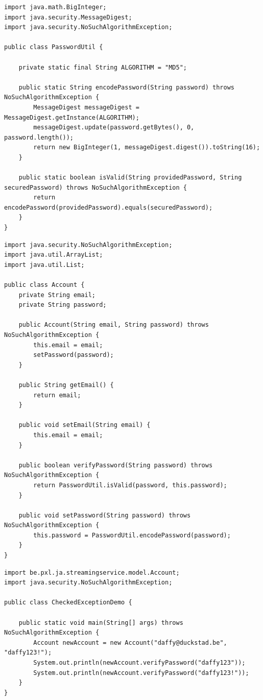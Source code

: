 \begin{lstlisting}
import java.math.BigInteger;
import java.security.MessageDigest;
import java.security.NoSuchAlgorithmException;

public class PasswordUtil {

	private static final String ALGORITHM = "MD5";

	public static String encodePassword(String password) throws NoSuchAlgorithmException {
		MessageDigest messageDigest = MessageDigest.getInstance(ALGORITHM);
		messageDigest.update(password.getBytes(), 0, password.length());
		return new BigInteger(1, messageDigest.digest()).toString(16);
	}

	public static boolean isValid(String providedPassword, String securedPassword) throws NoSuchAlgorithmException {
		return encodePassword(providedPassword).equals(securedPassword);
	}
}
\end{lstlisting}

\begin{lstlisting}
import java.security.NoSuchAlgorithmException;
import java.util.ArrayList;
import java.util.List;

public class Account {
	private String email;
	private String password;

	public Account(String email, String password) throws NoSuchAlgorithmException {
		this.email = email;
		setPassword(password);
	}

	public String getEmail() {
		return email;
	}

	public void setEmail(String email) {
		this.email = email;
	}

	public boolean verifyPassword(String password) throws NoSuchAlgorithmException {
		return PasswordUtil.isValid(password, this.password);
	}

	public void setPassword(String password) throws NoSuchAlgorithmException {
		this.password = PasswordUtil.encodePassword(password);
	}
}
\end{lstlisting}

\begin{lstlisting}
import be.pxl.ja.streamingservice.model.Account;
import java.security.NoSuchAlgorithmException;

public class CheckedExceptionDemo {

	public static void main(String[] args) throws NoSuchAlgorithmException {
		Account newAccount = new Account("daffy@duckstad.be", "daffy123!");
		System.out.println(newAccount.verifyPassword("daffy123"));
		System.out.println(newAccount.verifyPassword("daffy123!"));
	}
}
\end{lstlisting}

